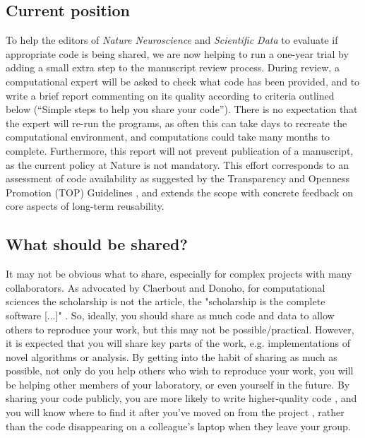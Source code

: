 \documentclass[11pt]{article}
\begin{document}
\subsection*{Current position}

To help the editors of \textit{Nature Neuroscience} and
\textit{Scientific Data} to evaluate if appropriate code is being
shared, we are now helping to run a one-year trial by adding a small
extra step to the manuscript review process.  During review, a
computational expert will be asked to check what code has been
provided, and to write a brief report commenting on its quality
according to criteria outlined below (``Simple steps to help you share
your code'').  There is no expectation that the expert will re-run the
programs, as often this can take days to recreate the computational
environment, and computations could take many months to complete.
Furthermore, this report will not prevent publication of a manuscript, as the current policy at Nature is not mandatory.
This effort corresponds to an assessment of code availability as suggested by
the Transparency and Openness Promotion (TOP) Guidelines \cite{Nosek2015}, and
extends the scope with concrete feedback on core aspects of long-term reusability.

\subsection*{What should be shared?}

It may not be obvious what to share, especially for complex projects with many
collaborators.
As advocated by Claerbout and Donoho, for computational sciences the scholarship is not the article, the "scholarship is the complete software [...]" \cite{claerbout_electronic_1992,donoho_invitation_2010}.
So, ideally, you should share as much code and data to allow others to
reproduce your work,  but this may not be possible/practical.  However, it
is expected that you will share key parts of the work, e.g. implementations of
novel algorithms or analysis.  By getting into the habit of sharing as much as
possible, not only do you help others who wish to reproduce your work, you will be
helping other members of your laboratory, or even yourself in the future.  By
sharing your code publicly, you are more likely to write higher-quality code
\cite{Easterbrook2014}, and you will know where to find it after you've moved on
from the project \cite{Halchenko2015}, rather than the code disappearing on a
colleague's laptop when they leave your group.
\end{document}
